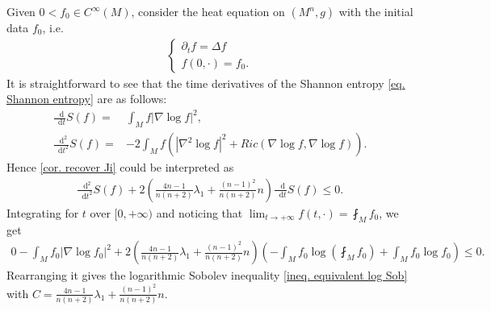 \documentclass[11pt]{amsart}
\numberwithin{equation}{section}
\numberwithin{lemma}{section}
\numberwithin{proposition}{section}
\numberwithin{corollary}{section}
\numberwithin{remark}{section}
\newcommand{\dd}{\mathop{}\!\mathrm{d}}%
\begin{document}
Given $0<f_0\in C^{\infty}(M)$, consider the heat equation on $(M^n,g)$ with the initial data $f_0$, i.e.
    \begin{align*}
        \begin{cases}
            \partial_tf=\Delta f\\
            f(0,\cdot)=f_0.
        \end{cases}
    \end{align*}
    It is straightforward to see that the time derivatives of the Shannon entropy \cref{eq. Shannon entropy} are as follows:
    \begin{align*}
        \frac{\dd }{\dd t}S(f)
        =&\int_M f|\nabla\log f|^2,\\
        \frac{\dd^2}{\dd t^2}S(f)
        =&-2\int_M f\left(
        |\nabla^2\log f|^2+Ric(\nabla \log f,\nabla \log f)
        \right).
    \end{align*}
    Hence \cref{cor. recover Ji} could be interpreted as
    \begin{align*}%
        \frac{\dd^2}{\dd t^2}S(f)
        +2\left(
        \frac{4n-1}{n(n+2)}\lambda_1
            +\frac{(n-1)^2}{n(n+2)}n
        \right)
        \frac{\dd}{\dd t}S(f)
        \leq 0.
    \end{align*}
    Integrating for $t$ over $[0,+\infty)$ and noticing that $\lim_{t\to+\infty}f(t,\cdot)=\fint_M f_0$, we get
    \begin{align*}
        0-\int_Mf_0|\nabla\log f_0|^2
        +2\left(
        \frac{4n-1}{n(n+2)}\lambda_1
            +\frac{(n-1)^2}{n(n+2)}n
        \right)
        \left(
        -\int_M f_0 \log\left(\fint_M f_0\right)
        +\int_M f_0\log f_0
        \right)
        \leq 0.
    \end{align*}
    Rearranging it gives the logarithmic Sobolev inequality \cref{ineq. equivalent log Sob} with $C
    =\frac{4n-1}{n(n+2)}\lambda_1
            +\frac{(n-1)^2}{n(n+2)}n
        $.
\end{document}
